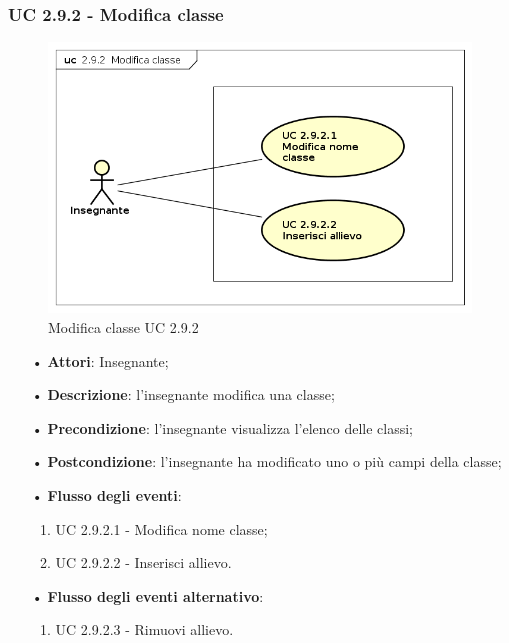 \subsubsection{UC 2.9.2 - Modifica classe}
\begin{figure}[H]
	\centering
	\includegraphics[width=17cm]{img/ModificaClasse.png} 
	\caption{Modifica classe UC 2.9.2}
\end{figure}

\begin{itemize}
	\item[•] \textbf{Attori}: Insegnante;
	\item[•] \textbf{Descrizione}: l'insegnante modifica una classe;
	\item[•] \textbf{Precondizione}: l'insegnante visualizza l'elenco delle classi;
	\item[•] \textbf{Postcondizione}: l'insegnante ha modificato uno o più campi della classe;
	\item[•] \textbf{Flusso degli eventi}:
	\begin{enumerate}
		\item UC 2.9.2.1 - Modifica nome classe;
		\item UC 2.9.2.2 - Inserisci allievo.
	\end{enumerate}
	\item[•] \textbf{Flusso degli eventi alternativo}:
	\begin{enumerate}
		\item UC 2.9.2.3 - Rimuovi allievo.
	\end{enumerate}
\end{itemize}

